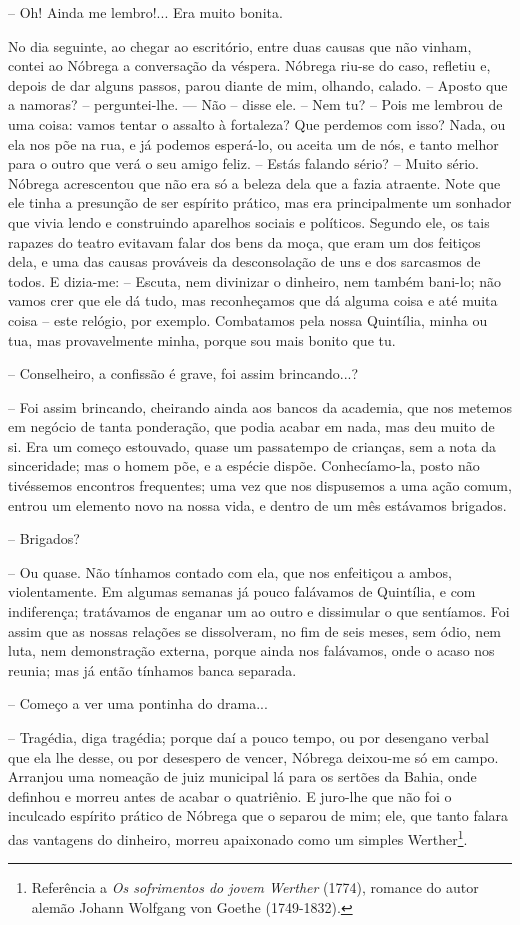 -- Oh! Ainda me lembro!... Era muito bonita.

No dia seguinte, ao chegar ao escritório, entre duas causas que não
vinham, contei ao Nóbrega a conversação da véspera. Nóbrega riu-se do
caso, refletiu e, depois de dar alguns passos, parou diante de mim,
olhando, calado. -- Aposto que a namoras? ­-- perguntei-lhe. --- Não --
disse ele. -- Nem tu? -- Pois me lembrou de uma coisa: vamos tentar o
assalto à fortaleza? Que perdemos com isso? Nada, ou ela nos põe na rua,
e já podemos esperá-lo, ou aceita um de nós, e tanto melhor para o outro
que verá o seu amigo feliz. -- Estás falando sério? -- Muito sério.
Nóbrega acrescentou que não era só a beleza dela que a fazia atraente.
Note que ele tinha a presunção de ser espírito prático, mas era
principalmente um sonhador que vivia lendo e construindo aparelhos
sociais e políticos. Segundo ele, os tais rapazes do teatro evitavam
falar dos bens da moça, que eram um dos feitiços dela, e uma das causas
prováveis da desconsolação de uns e dos sarcasmos de todos. E dizia-me:
-- Escuta, nem divinizar o dinheiro, nem também bani-lo; não vamos crer
que ele dá tudo, mas reconheçamos que dá alguma coisa e até muita coisa
-- este relógio, por exemplo. Combatamos pela nossa Quintília, minha ou
tua, mas provavelmente minha, porque sou mais bonito que tu.

-- Conselheiro, a confissão é grave, foi assim brincando...?

-- Foi assim brincando, cheirando ainda aos bancos da academia, que nos
metemos em negócio de tanta ponderação, que podia acabar em nada, mas
deu muito de si. Era um começo estouvado, quase um passatempo de
crianças, sem a nota da sinceridade; mas o homem põe, e a espécie
dispõe. Conhecíamo-la, posto não tivéssemos encontros frequentes; uma
vez que nos dispusemos a uma ação comum, entrou um elemento novo na
nossa vida, e dentro de um mês estávamos brigados.

-- Brigados?

-- Ou quase. Não tínhamos contado com ela, que nos enfeitiçou a ambos,
violentamente. Em algumas semanas já pouco falávamos de Quintília, e com
indiferença; tratávamos de enganar um ao outro e dissimular o que
sentíamos. Foi assim que as nossas relações se dissolveram, no fim de
seis meses, sem ódio, nem luta, nem demonstração externa, porque ainda
nos falávamos, onde o acaso nos reunia; mas já então tínhamos banca
separada.

-- Começo a ver uma pontinha do drama...

-- Tragédia, diga tragédia; porque daí a pouco tempo, ou por desengano
verbal que ela lhe desse, ou por desespero de vencer, Nóbrega deixou-me
só em campo. Arranjou uma nomeação de juiz municipal lá para os sertões
da Bahia, onde definhou e morreu antes de acabar o quatriênio. E
juro-lhe que não foi o inculcado espírito prático de Nóbrega que o
separou de mim; ele, que tanto falara das vantagens do dinheiro, morreu
apaixonado como um simples Werther\footnote{Referência a \emph{Os
  sofrimentos do jovem Werther} (1774), romance do autor alemão Johann
  Wolfgang von Goethe (1749-1832).}.

